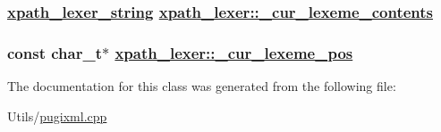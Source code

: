 \hypertarget{classxpath__lexer_7fa3402e23b860db2386b00995e69d20}{
\subsubsection[\_\-cur\_\-lexeme\_\-contents]{\setlength{\rightskip}{0pt plus 5cm}\hyperlink{structxpath__lexer__string}{xpath\_\-lexer\_\-string} \hyperlink{classxpath__lexer_7fa3402e23b860db2386b00995e69d20}{xpath\_\-lexer::\_\-cur\_\-lexeme\_\-contents}}}
\label{classxpath__lexer_7fa3402e23b860db2386b00995e69d20}


\hypertarget{classxpath__lexer_01e5586ea5b1bfa456cd5318bad9f793}{
\subsubsection[\_\-cur\_\-lexeme\_\-pos]{\setlength{\rightskip}{0pt plus 5cm}const char\_\-t$\ast$ \hyperlink{classxpath__lexer_01e5586ea5b1bfa456cd5318bad9f793}{xpath\_\-lexer::\_\-cur\_\-lexeme\_\-pos}}}
\label{classxpath__lexer_01e5586ea5b1bfa456cd5318bad9f793}




The documentation for this class was generated from the following file:\begin{CompactItemize}
\item 
Utils/\hyperlink{pugixml_8cpp}{pugixml.cpp}\end{CompactItemize}
